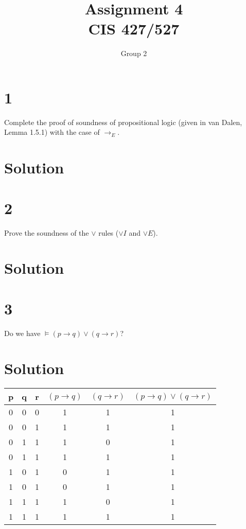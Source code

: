 \documentclass[10pt]{article}
\begin{document}
\title{Assignment \raisebox{.22ex}{\large\#}4 \\
	CIS 427/527}
\author{Group 2}

\maketitle

\section*{1}

Complete the proof of soundness of propositional logic (given in van Dalen, Lemma 1.5.1) with the case of $\to _E$.

\section*{Solution}


\section*{2}

Prove the soundness of the $\lor$ rules ($\lor I$ and $\lor E$).

\section*{Solution}

\section*{3}

Do we have $\models (p \to q) \lor (q\to r)$?

\section*{Solution}


\begin{tabular}{ c | c | c | c | c || c }    
  p & q & r & $(p\to q)$ & $(q\to r)$ & $(p\to q)\lor (q\to r)$\\
  \hline
  0 & 0 & 0 & 1 & 1 & 1\\
  0 & 0 & 1 & 1 & 1 & 1\\
  0 & 1 & 1 & 1 & 0 & 1\\
  0 & 1 & 1 & 1 & 1 & 1\\
  1 & 0 & 1 & 0 & 1 & 1\\
  1 & 0 & 1 & 0 & 1 & 1\\
  1 & 1 & 1 & 1 & 0 & 1\\
  1 & 1 & 1 & 1 & 1 & 1\\
\end{tabular}
\end{document}
